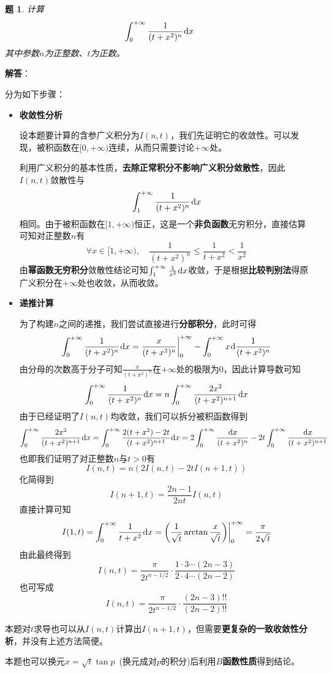 \documentclass[a4paper,UTF8,fontset=windows,AutoFakeBold]{ctexart}
\newcommand*{\dr}{\hspace{0.07em}\mathrm{d}}
\newcommand*{\note}{\noindent *}
\theoremstyle{ex}
\newtheorem{exercise}{题}
\newcommand{\sol}[1]{{\vspace{5pt}\kaishu\noindent\textbf{解答}：\vspace{-3pt}
\begin{compactitem}
    \item[] #1
\end{compactitem}
}}
\begin{document}
\begin{framed}
\begin{exercise}
    计算
    $$\int_0^{+\infty}\frac{1}{(t+x^2)^n}\dr x$$
    其中参数$n$为正整数、$t$为正数。
\end{exercise}
\sol{
    分为如下步骤：
    \begin{itemize}
        \item \textbf{收敛性分析}
        
        设本题要计算的含参广义积分为$I(n,t)$，我们先证明它的收敛性。可以发现，被积函数在$[0,+\infty)$连续，从而只需要讨论$+\infty$处。
        
        利用广义积分的基本性质，\textbf{去除正常积分不影响广义积分敛散性}，因此$I(n,t)$敛散性与
        $$\int_1^{+\infty}\frac{1}{(t+x^2)^n}\dr x$$
        相同。由于被积函数在$[1,+\infty)$恒正，这是一个\textbf{非负函数}无穷积分，直接估算可知对正整数$n$有
        $$\forall x\in[1,+\infty),\quad\frac{1}{(t+x^2)^n}\le\frac{1}{t+x^2}<\frac{1}{x^2}$$
        由\textbf{幂函数无穷积分}敛散性结论可知$\int_1^{+\infty}\frac{1}{x^2}\dr x$收敛，于是根据\textbf{比较判别法}得原广义积分在$+\infty$处也收敛，从而收敛。

        \item \textbf{递推计算}
        
        为了构建$n$之间的递推，我们尝试直接进行\textbf{分部积分}，此时可得
        $$\int_0^{+\infty}\frac{1}{(t+x^2)^n}\dr x=\frac{x}{(t+x^2)^n}\bigg|^{+\infty}_0-\int_0^{+\infty}x\dr\frac{1}{(t+x^2)^n}$$
        由分母的次数高于分子可知$\frac{x}{(t+x^2)^n}$在$+\infty$处的极限为0，因此计算导数可知
        $$\int_0^{+\infty}\frac{1}{(t+x^2)^n}\dr x=n\int_0^{+\infty}\frac{2x^2}{(t+x^2)^{n+1}}\dr x$$
        由于已经证明了$I(n,t)$均收敛，我们可以拆分被积函数得到
        $$\int_0^{+\infty}\frac{2x^2}{(t+x^2)^{n+1}}\dr x=\int_0^{+\infty}\frac{2(t+x^2)-2t}{(t+x^2)^{n+1}}\dr x=2\int_0^{+\infty}\frac{\dr x}{(t+x^2)^n}-2t\int_0^{+\infty}\frac{\dr x}{(t+x^2)^{n+1}}$$
        也即我们证明了对正整数$n$与$t>0$有
        $$I(n,t)=n(2I(n,t)-2tI(n+1,t))$$
        化简得到
        $$I(n+1,t)=\frac{2n-1}{2nt}I(n,t)$$
        直接计算可知
        $$I(1,t)=\int_0^{+\infty}\frac{1}{t+x^2}\dr x=\bigg(\frac{1}{\sqrt{t}}\arctan\frac{x}{\sqrt{t}}\bigg)\bigg|^{+\infty}_0=\frac{\pi}{2\sqrt{t}}$$
        由此最终得到
        $$I(n,t)=\frac{\pi}{2t^{n-1/2}}\cdot\frac{1\cdot3\cdots(2n-3)}{2\cdot4\cdots(2n-2)}$$
        也可写成
        $$I(n,t)=\frac{\pi}{2t^{n-1/2}}\cdot\frac{(2n-3)!!}{(2n-2)!!}$$
    \end{itemize}

    \note 本题对$t$求导也可以从$I(n,t)$计算出$I(n+1,t)$，但需要\textbf{更复杂的一致收敛性分析}，并没有上述方法简便。

    \note 本题也可以换元$x=\sqrt{t}\tan p$\ (换元成对$p$的积分)后利用\textbf{$B$函数性质}得到结论。
}
\end{framed}
\end{document}
